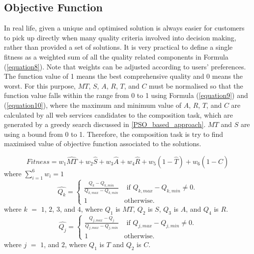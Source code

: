 \documentclass{llncs}
\begin{document}
\subsection{Objective Function}
In real life, given a unique and optimised solution is always easier for customers to pick up directly when many quality criteria involved into decision making, rather than provided a set of solutions. It is very practical to define a single fitness as a weighted sum of all the quality related components in Formula (\ref{equation8}). Note that weights can be adjusted according to users' preferences. The function value of 1 means the best comprehensive quality and 0 means the worst. For this purpose, $MT$, $S$, $A$, $R$, $T$, and $C$ must be normalised so that the function value falls within the range from 0 to 1 using Formula (\ref{equation9}) and (\ref{equation10}), where the maximum and minimum value of $A$, $R$, $T$, and $C$ are calculated by all web services candidates to the composition task, which are generated by a greedy search discussed in \ref{PSO_based_approach}. $MT$ and $S$ are using a bound from 0 to 1. Therefore, the composition task is try to find maximised value of objective function associated to the solutions.

\vspace{-0.2cm}
\begin{equation}
\label{equation8}
Fitness = w_1 \hat{MT} + w_2 \hat{S} + w_3 \hat{A} + w_4 \hat{R} + w_5(1 - \hat{T}) + w_6(1 - \hat{C})
\end{equation}
\noindent where $\sum_{i=1}^{6} w_i = 1$
\\
\vspace{-0.2cm}
\begin{equation}
\label{equation9}
\hat{Q_k} = 
\begin{cases}
	\frac{Q_k - Q_{k, min}}{Q_{k, max} - Q_{k, min}} & \text{ if }Q_{k, max} - Q_{k, min} \neq 0.\\
	1 & \mathrm{ otherwise}.
\end{cases}
\end{equation}
\noindent where $k$ $=$ $1$, $2$, $3$, and $4$, where $Q_1$ is $MT$, $Q_2$ is $S$, $Q_3$ is $A$, and $Q_4$ is $R$.
\begin{equation}
\label{equation10}
\hat{Q_j} = 
\begin{cases}
	\frac{Q_{j,max} - Q_j}{Q_{j, max} - Q_{j, min}} & \text{ if }Q_{j, max} - Q_{j, min} \neq 0.\\
	1 & \mathrm{ otherwise}.
\end{cases}
\end{equation}
\noindent where $j$ $=$ $1$, and $2$, where $Q_1$ is $T$ and $Q_2$ is $C$.
\end{document}
